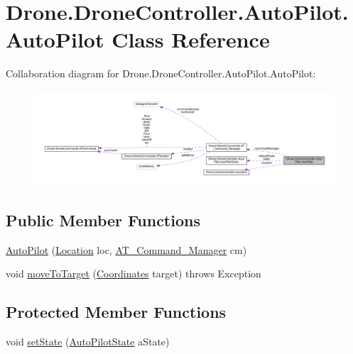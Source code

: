 \hypertarget{class_drone_1_1_drone_controller_1_1_auto_pilot_1_1_auto_pilot}{}\section{Drone.\+Drone\+Controller.\+Auto\+Pilot.\+Auto\+Pilot Class Reference}
\label{class_drone_1_1_drone_controller_1_1_auto_pilot_1_1_auto_pilot}


Collaboration diagram for Drone.\+Drone\+Controller.\+Auto\+Pilot.\+Auto\+Pilot\+:\nopagebreak
\begin{figure}[H]
\begin{center}
\leavevmode
\includegraphics[width=350pt]{class_drone_1_1_drone_controller_1_1_auto_pilot_1_1_auto_pilot__coll__graph}
\end{center}
\end{figure}
\subsection*{Public Member Functions}
\begin{DoxyCompactItemize}
\item 
\hyperlink{class_drone_1_1_drone_controller_1_1_auto_pilot_1_1_auto_pilot_a83dbbe7bc1d63169f5b913963fa9fa92}{Auto\+Pilot} (\hyperlink{class_drone_1_1_drone_controller_1_1_location}{Location} loc, \hyperlink{class_drone_1_1_drone_commands_1_1_a_t___command___manager}{A\+T\+\_\+\+Command\+\_\+\+Manager} cm)
\item 
void \hyperlink{class_drone_1_1_drone_controller_1_1_auto_pilot_1_1_auto_pilot_a9e5590bf12eec7180152284aa40c3338}{move\+To\+Target} (\hyperlink{class_drone_1_1_helpers_1_1_coordinates}{Coordinates} target)  throws Exception 	
\end{DoxyCompactItemize}
\subsection*{Protected Member Functions}
\begin{DoxyCompactItemize}
\item 
void \hyperlink{class_drone_1_1_drone_controller_1_1_auto_pilot_1_1_auto_pilot_a387d070b622e6a18883eca218826740b}{set\+State} (\hyperlink{interface_drone_1_1_drone_controller_1_1_auto_pilot_1_1_auto_pilot_state}{Auto\+Pilot\+State} a\+State)
\end{DoxyCompactItemize}
